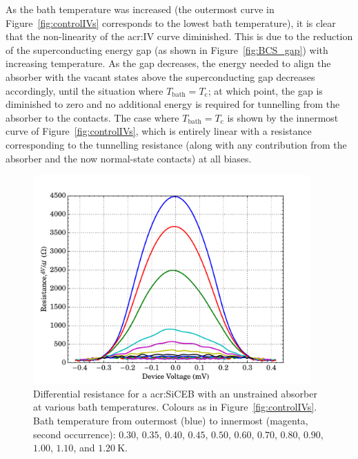 \par 
As the bath temperature was increased (the outermost curve in Figure~\ref{fig:controlIVs} corresponds to the lowest bath temperature), it is clear that the non-linearity of the \gls{acr:IV} curve diminished. This is due to the reduction of the superconducting energy gap (as shown in Figure~\ref{fig:BCS_gap}) with increasing temperature. As the gap decreases, the energy needed to align the absorber with the vacant states above the superconducting gap decreases accordingly, until the situation where $T_{\mathrm{bath}} = T_{\mathrm{c}}$; at which point, the gap is diminished to zero and no additional energy is required for tunnelling from the absorber to the contacts. The case where $T_{\mathrm{bath}} = T_{\mathrm{c}}$ is shown by the innermost curve of Figure~\ref{fig:controlIVs}, which is entirely linear with a resistance corresponding to the tunnelling resistance (along with any contribution from the absorber and the now normal-state contacts) at all biases. 
\par 
\begin{figure}[tb]
\begin{center}
\includegraphics[width = 0.95\textwidth]{figures/control_Rderiv}
\caption[Differential resistance for a \gls{acr:SiCEB} with an unstrained absorber]{Differential resistance for a \gls{acr:SiCEB} with an unstrained absorber at various bath temperatures. Colours as in Figure~\ref{fig:controlIVs}. Bath temperature from outermost (blue) to innermost (magenta, second occurrence): $0.30$, $0.35$, $0.40$, $0.45$, $0.50$, $0.60$, $0.70$, $0.80$, $0.90$, $1.00$, $1.10$, and $1.20~\mathrm{K}$.}
\label{fig:controlRderiv}
\end{center}
\end{figure}
